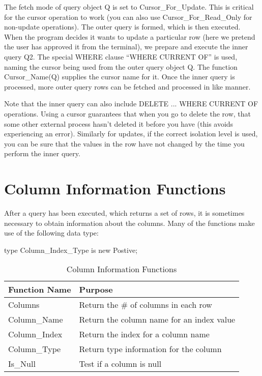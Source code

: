 \documentclass[english,letterpaper]{book}
\begin{document}
The fetch mode of query object Q is set to Cursor\_For\_Update. This is
critical for the cursor operation to work (you can also use
Cursor\_For\_Read\_Only for non-update operations). The outer query is
formed, which is then executed. When the program decides it wants to
update a particular row (here we pretend the user has approved it from
the terminal), we prepare and execute the inner query Q2. The special
WHERE clause ``WHERE CURRENT OF'' is used, naming the cursor being
used from the outer query object Q. The function Cursor\_Name(Q)
supplies the cursor name for it. Once the inner query is processed, more
outer query rows can be fetched and processed in like manner.

Note that the inner query can also include DELETE ... WHERE CURRENT
OF operations. Using a cursor guarantees that when you go to delete
the row, that some other external process hasn't deleted it before
you have (this avoids experiencing an error). Similarly for updates,
if the correct isolation level is used, you can be sure that the values
in the row have not changed by the time you perform the inner query.

\section{Column Information Functions}

After a query has been executed, which returns a set of rows, it is
sometimes necessary to obtain information about the columns. Many
of the functions make use of the following data type: 

\begin{Code}

	type Column_Index_Type is new Postive;

\end{Code}

\begin{table}
   \begin{center}
      \begin{tabular}{ll}
         Function Name           &  Purpose\\
         \hline   
         Columns                 &  Return the \# of columns in each row\\
         Column\_Name            &  Return the column name for an index value\\
         Column\_Index           &  Return the index for a column name\\
         Column\_Type            &  Return type information for the column\\
         Is\_Null                &  Test if a column is null\\
      \end{tabular}
   \end{center}
   \caption{Column Information Functions}\label{t:cif}
\end{table}
\end{document}
